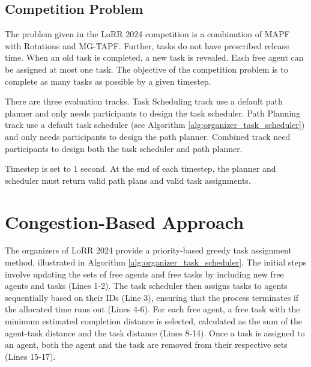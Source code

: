 \documentclass[letterpaper]{article} %
\begin{document}
\subsection{Competition Problem}
The problem given in the LoRR 2024 competition is a combination of MAPF with Rotations and MG-TAPF. 
Further, tasks do not have prescribed release time.
When an old task is completed, a new task is revealed. 
Each free agent can be assigned at most one task. 
The objective of the competition problem is to complete as many tasks as possible by a given timestep. 

There are three evaluation tracks. 
Task Scheduling track use a default path planner \cite{chen2024traffic} and only needs participants to design the task scheduler. 
Path Planning track use a default task scheduler (see Algorithm \ref{alg:organizer_task_scheduler}) and only needs participants to design the path planner. 
Combined track need participants to design both the task scheduler and path planner. 

Timestep is set to 1 second. 
At the end of each timestep, the planner and scheduler must return valid path plans and valid task assignments. 

\section{Congestion-Based Approach}

The organizers of LoRR 2024 provide a priority-based greedy task assignment method, illustrated in Algorithm \ref{alg:organizer_task_scheduler}. 
The initial steps involve updating the sets of free agents and free tasks by including new free agents and tasks (Lines 1-2). 
The task scheduler then assigns tasks to agents sequentially based on their IDs (Line 3), ensuring that the process terminates if the allocated time runs out (Lines 4-6). 
For each free agent, a free task with the minimum estimated completion distance is selected, calculated as the sum of the agent-task distance and the task distance (Lines 8-14). 
Once a task is assigned to an agent, both the agent and the task are removed from their respective sets (Lines 15-17).
\end{document}
